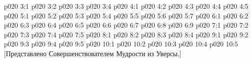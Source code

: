 \vs p020 3:1 
\vs p020 3:2 
\vs p020 3:3 
\vs p020 3:4 
\vs p020 4:1 
\vs p020 4:2 
\vs p020 4:3 
\vs p020 4:4 \pc 
\vs p020 4:5 
\vs p020 5:1 
\vs p020 5:2 
\vs p020 5:3 
\vs p020 5:4 
\vs p020 5:5 \pc 
\vs p020 5:6 
\vs p020 5:7 \pc 
{}
\vs p020 6:1 
\vs p020 6:2 \pc 
\vs p020 6:3 
\vs p020 6:4 
\vs p020 6:5 \pc 
\vs p020 6:6 \pc 
\vs p020 6:7 
\vs p020 6:8 
\vs p020 6:9 
\vs p020 7:1 
\vs p020 7:2 
\vs p020 7:3 
\vs p020 7:4 
\vs p020 7:5 
\vs p020 8:1 
\vs p020 8:2 
\vs p020 8:3 
\vs p020 8:4 
\vs p020 9:1 
\vs p020 9:2 
\vs p020 9:3 
\vs p020 9:4 
\vs p020 9:5 \pc 
{}
\vs p020 10:1 
\vs p020 10:2 
\vs p020 10:3 
\vs p020 10:4 
\vsetoff
\vs p020 10:5 [Представлено Совершенствователем Мудрости из Уверсы.]
\quizlink
